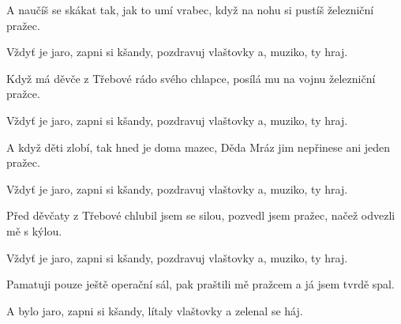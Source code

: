 \beginverse{}
\chordsoff{}
A naučíš se skákat tak, jak to umí vrabec,
když na nohu si pustíš železniční pražec.
\chordson{}
\endverse{}

\repeatingchorus{}
\beginchorus{}
\chordsoff{}
Vždyť je jaro, zapni si kšandy,
pozdravuj vlaštovky a, muziko, ty hraj.
\chordson{}
\endchorus{}

\beginverse{}
\chordsoff{}
Když má děvče z Třebové rádo svého chlapce,
posílá mu na vojnu železniční pražce.
\chordson{}
\endverse{}

\repeatingchorus{}
\beginchorus{}
\chordsoff{}
Vždyť je jaro, zapni si kšandy,
pozdravuj vlaštovky a, muziko, ty hraj.
\chordson{}
\endchorus{}

\beginverse{}
\chordsoff{}
A když děti zlobí, tak hned je doma mazec,
Děda Mráz jim nepřinese ani jeden pražec.
\chordson{}
\endverse{}

\repeatingchorus{}
\beginchorus{}
\chordsoff{}
Vždyť je jaro, zapni si kšandy,
pozdravuj vlaštovky a, muziko, ty hraj.
\chordson{}
\endchorus{}

\beginverse{}
\chordsoff{}
Před děvčaty z Třebové chlubil jsem se silou,
pozvedl jsem pražec, načež odvezli mě s kýlou.
\chordson{}
\endverse{}

\repeatingchorus{}
\beginchorus{}
\chordsoff{}
Vždyť je jaro, zapni si kšandy,
pozdravuj vlaštovky a, muziko, ty hraj.
\chordson{}
\endchorus{}

\beginverse{}
\chordsoff{}
Pamatuji pouze ještě operační sál,
pak praštili mě pražcem a já jsem tvrdě spal.
\chordson{}
\endverse{}

\beginchorus{}
\chordsoff{}
A bylo jaro, zapni si kšandy,
lítaly vlaštovky a zelenal se háj.
\chordson{}
\endchorus{}

\endsong{}
